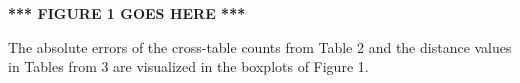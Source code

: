 \documentclass[10pt]{article}
\newif\ifcolor
\begin{document}


\textbf{*** FIGURE 1 GOES HERE ***}

The absolute errors of the cross-table counts from Table 2 and the distance values in Tables from 3 are visualized in the boxplots of Figure 1.

\end{document}
